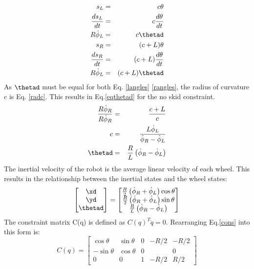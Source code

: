\documentclass[MTRX3700report.tex]{subfiles}
\begin{document}
\begin{eqnarray}
s_L &=& c\theta \nonumber\\
\frac{ds_L}{dt} &=& c\frac{d\theta}{dt} \nonumber\\ 
R\dot{\phi}_L &=& c\thetad \label{langles}\\
s_R &=& (c+L)\theta \nonumber\\
\frac{ds_R}{dt} &=& (c+L)\frac{d\theta}{dt} \nonumber\\ 
R\dot{\phi}_L &=& (c+L)\thetad \label{rangles}
\end{eqnarray}
As $\thetad$ must be equal for both Eq. \eqref{langles} \eqref{rangles}, the radius of curvature c is Eq. \eqref{radc}. This results in Eq.\eqref{eqthetad} for the no skid constraint.
\begin{eqnarray}
\frac{R\dot{\phi}_R}{R\dot{\phi}_R} &=& \frac{c+L}{c}\nonumber\\
c &=& \frac{L\dot{\phi}_L}{\dot{\phi}_R - \dot{\phi}_L} \label{radc}\\
\thetad &=& \frac{R}{L}\left( \dot{\phi}_R - \dot{\phi}_L \right) \label{eqthetad}
\end{eqnarray}
The inertial velocity of the robot is the average linear velocity of each wheel. This results in the relationship between the inertial states and the wheel states:
\begin{equation}
\begin{bmatrix}
\xd \\ \yd \\ \thetad
\end{bmatrix} = 
\begin{bmatrix}
\frac{R}{2}\left( \dot{\phi}_R + \dot{\phi}_L \right)\cos\theta \\
\frac{R}{2}\left( \dot{\phi}_R + \dot{\phi}_L \right)\sin\theta \\
\frac{R}{L}\left( \dot{\phi}_R - \dot{\phi}_L \right) 
\end{bmatrix} \label{cons}
\end{equation}
The constraint matrix C(q) is defined as $C(q)^T\dot{q} = 0$. Rearranging Eq.\eqref{cons} into this form is:
\begin{equation}
C(q) = \begin{bmatrix}
\cos\theta & \sin\theta & 0 & -R/2 & -R/2 \\
-\sin\theta & \cos\theta & 0 &  & 0\\
0 & 0 & 1 & -R/2 & R/2
\end{bmatrix}
\end{equation}
\end{document}
